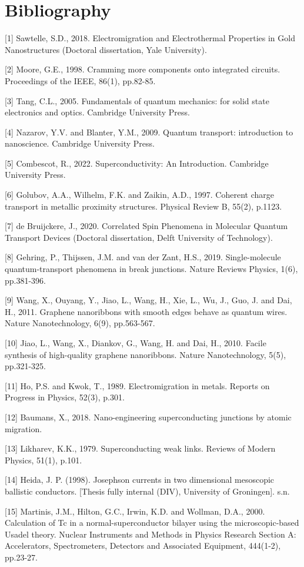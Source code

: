 \section*{Bibliography}


 
[1] Sawtelle, S.D., 2018. Electromigration and Electrothermal Properties in Gold Nanostructures (Doctoral dissertation, Yale University).

[2] Moore, G.E., 1998. Cramming more components onto integrated circuits. Proceedings of the IEEE, 86(1), pp.82-85.


[3] Tang, C.L., 2005. Fundamentals of quantum mechanics: for solid state electronics and optics. Cambridge University Press.

[4] Nazarov, Y.V. and Blanter, Y.M., 2009. Quantum transport: introduction to nanoscience. Cambridge University Press.

[5] Combescot, R., 2022. Superconductivity: An Introduction. Cambridge University Press.

[6] Golubov, A.A., Wilhelm, F.K. and Zaikin, A.D., 1997. Coherent charge transport in metallic proximity structures. Physical Review B, 55(2), p.1123.

[7] de Bruijckere, J., 2020. Correlated Spin Phenomena in Molecular Quantum Transport Devices (Doctoral dissertation, Delft University of Technology).

[8] Gehring, P., Thijssen, J.M. and van der Zant, H.S., 2019. Single-molecule quantum-transport phenomena in break junctions. Nature Reviews Physics, 1(6), pp.381-396.

[9] Wang, X., Ouyang, Y., Jiao, L., Wang, H., Xie, L., Wu, J., Guo, J. and Dai, H., 2011. Graphene nanoribbons with smooth edges behave as quantum wires. Nature Nanotechnology, 6(9), pp.563-567.

[10] Jiao, L., Wang, X., Diankov, G., Wang, H. and Dai, H., 2010. Facile synthesis of high-quality graphene nanoribbons. Nature Nanotechnology, 5(5), pp.321-325.

[11] Ho, P.S. and Kwok, T., 1989. Electromigration in metals. Reports on Progress in Physics, 52(3), p.301.

[12] Baumans, X., 2018. Nano-engineering superconducting junctions by atomic migration.

[13] Likharev, K.K., 1979. Superconducting weak links. Reviews of Modern Physics, 51(1), p.101.

[14] Heida, J. P. (1998). Josephson currents in two dimensional mesoscopic ballistic conductors. [Thesis fully
internal (DIV), University of Groningen]. s.n.

[15] Martinis, J.M., Hilton, G.C., Irwin, K.D. and Wollman, D.A., 2000. Calculation of Tc in a normal-superconductor bilayer using the microscopic-based Usadel theory. Nuclear Instruments and Methods in Physics Research Section A: Accelerators, Spectrometers, Detectors and Associated Equipment, 444(1-2), pp.23-27.